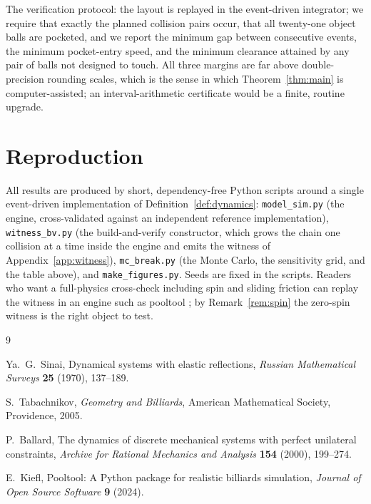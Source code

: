 \documentclass[11pt]{article}
\theoremstyle{definition}
\theoremstyle{remark}
\begin{document}
The verification protocol: the layout is replayed in the
event-driven integrator; we require that exactly the planned
collision pairs occur, that all twenty-one object balls are pocketed,
and we report the minimum gap between consecutive events, the
minimum pocket-entry speed, and the minimum clearance attained by any
pair of balls not designed to touch. All three margins are far above
double-precision rounding scales, which is the sense in which
Theorem~\ref{thm:main} is computer-assisted; an interval-arithmetic
certificate would be a finite, routine upgrade.

\section{Reproduction}

All results are produced by short, dependency-free Python scripts
around a single event-driven implementation of
Definition~\ref{def:dynamics}: \texttt{model\_sim.py} (the engine,
cross-validated against an independent reference implementation),
\texttt{witness\_bv.py} (the build-and-verify constructor, which
grows the chain one collision at a time inside the engine and emits
the witness of Appendix~\ref{app:witness}), \texttt{mc\_break.py}
(the Monte Carlo, the sensitivity grid, and the table above), and
\texttt{make\_figures.py}. Seeds are fixed in the scripts. Readers
who want a full-physics cross-check including spin and sliding
friction can replay the witness in an engine such as pooltool
\cite{kiefl2024}; by Remark~\ref{rem:spin} the zero-spin witness is
the right object to test.

\begin{thebibliography}{9}

Ya.\ G.\ Sinai,
Dynamical systems with elastic reflections,
\emph{Russian Mathematical Surveys} \textbf{25} (1970), 137--189.

S.\ Tabachnikov,
\emph{Geometry and Billiards},
American Mathematical Society, Providence, 2005.

P.\ Ballard,
The dynamics of discrete mechanical systems with perfect unilateral
constraints,
\emph{Archive for Rational Mechanics and Analysis} \textbf{154}
(2000), 199--274.

E.\ Kiefl,
Pooltool: A Python package for realistic billiards simulation,
\emph{Journal of Open Source Software} \textbf{9} (2024).


\end{thebibliography}
\end{document}
